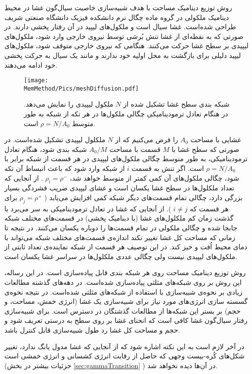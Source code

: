 روش توزیع دینامیک مساحت 
با هدف  شبیه‌سازی خاصیت سیال‌گون غشا در محیط دینامیک ملکولی در گروه ماده چگال نرم دانشکده فیزیک دانشگاه صنعتی شریف طراحی شده‌است.  غشا سیال است و ملکول‌های لیپید در آن رفتار پخشی دارند. در صورتی که به نقطه‌ای از غشا تنش بُرشی توسط نیروی خارجی وارد شود، ملکول‌های لیپیدی بر سطح غشا حرکت می‌کنند. هنگامی که نیروی‌ خارجی متوقف شود، ملکول‌های لیپید دلیلی برای بازگشت به محل اولیه خود ندارند و مانند یک سیال به حرکت پخشی خود ادامه می‌دهند. 

\begin{figure}[h]
\begin{center}
\texttt{[image: \\MemMethod/Pics/meshDiffusion.pdf]}
\caption{
شبکه بندی سطح غشا تشکیل شده از 
$N$
ملکول لیپیدی را نمایش می‌دهد. در هنگام تعادل ترمودینامیکی چگالی ملکول‌ها در هر تکه از شبکه به طور متوسط
$\rho=N/A_0$
است.
}
\label{fig:cylindermesh}
\end{center}
\end{figure}

غشایی با مساحت 
$A_0$
را فرض می‌کنیم که از 
$N$
ملکلول لیپیدی تشکیل شده‌است. در صورتی که سطح غشا با 
$M$
قسمت با مساحت 
$A_0/M$
شبکه بندی شود، هنگام  تعادل ترمودینامیکی، به طور متوسط چگالی ملکول‌های لیپیدی در هر قسمت از شبکه برابر با 
$\rho=N/A_0$
است. اگر تنش  به قسمت
$i$
از شبکه وارد شود که باعث انبساط آن تکه شود، چگالی ملکول‌های آن کمی کمتر از متوسط خواهد شد،
$\rho_i=\rho^-$
. از آنجایی که تعداد ملکلو‌ل‌ها در سطح غشا یکسان است و غشای لیپیدی ضریب فشردگی بسیار بزرگی دارد، چگالی تمام قسمت‌های دیگر شبکه کمی افزایش می‌یابد (
$\rho_j=\rho^+$
برای هر قسمت که
$i\neq j$
). از آنجایی که غشا در تعادل ترمودینامیکی به سر می‌برد با گذشت زمان کم ملکلول‌های غشا (با دینامیک پخشی) در قسمت‌های مختلف شبکه جابجا شده و چگالی ملکولی در تمام قسمت‌ها را دوباره یکسان می‌کنند. در نتیجه تا زمانی که مساحت کل غشا تغییر نکند اندازه‌ی قسمت‌های مختلف شبکه می‌تواند با دمای محیط اُفت  و خیز کند. در این توصیف هر قسمت از شبکه نماینده‌ی تعداد ثابتی از ملکول‌های لیپیدی نیست ولی چگالی عددی ملکلول‌ها در سراسر غشا یکسان است.

روش توزیع دینامیک مساحت روی هر شبکه‌ بندی قابل پیاده‌سازی است. در این رساله، این روش بر روی شبکه‌های مثلثی پیاده‌سازی شده‌است. در دهه‌های گذشته مطالعات زیادی بر نحوه‌ی شبیه‌سازی با استفاده از شبکه‌های مثلثی شده‌است. در نتیجه نحوه‌ی گسسته سازی انرژی‌های مورد نیاز برای شبیه‌سازی یک غشا (انرژی خمش، مساحت، و حجم) بر بستر این شبکه‌ها از مطالعات گذشتگان در دسترس است. برای شبیه‌سازی رفتار سیال‌گون غشا کافی ‌است که انحنای غشا بر روی سطح به درستی تعریف شود و حجم و مساحت کل غشا رد طول شبیه‌سازی قابل کنترل باشد. 

در آخر لازم است به این نکته اشاره شود که از آنجایی که غشا‌ مدول یانگ ندارد، تغییر شکل‌های کُره-بیست وجهی که حاصل از رقابت انرژی کشسانی و انرژی خمشی است (جزئیات بیشتر در بخش 
\ref{sec:gammaTransition}
) در آن‌ها دیده نخواهد شد.




